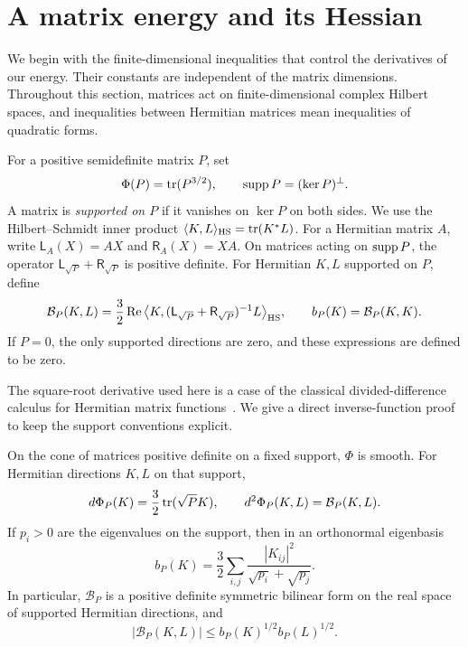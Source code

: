 \section{A matrix energy and its Hessian}\label{sec:matrix}

We begin with the finite-dimensional inequalities that control the
derivatives of our energy.  Their constants are independent of the
matrix dimensions.  Throughout this section, matrices act on
finite-dimensional complex Hilbert spaces, and inequalities between
Hermitian matrices mean inequalities of quadratic forms.

For a positive semidefinite matrix $P$, set
\[
 \Phi(P)=\operatorname{tr}(P^{3/2}),
 \qquad \operatorname{supp} P=(\ker P)^\perp.
\]
A matrix is \emph{supported on $P$} if it vanishes on $\ker P$ on
both sides.  We use the Hilbert--Schmidt inner product
$\langle K,L\rangle_{\mathrm{HS}}=\operatorname{tr}(K^*L)$.
For a Hermitian matrix $A$, write
$\mathsf L_A(X)=AX$ and $\mathsf R_A(X)=XA$.
On matrices acting on $\operatorname{supp} P$, the operator
$\mathsf L_{\sqrt P}+\mathsf R_{\sqrt P}$ is positive definite.
For Hermitian $K,L$ supported on $P$, define
\[
 \mathcal B_P(K,L)
 =\frac32\operatorname{Re}
   \big\langle K,
    (\mathsf L_{\sqrt P}+\mathsf R_{\sqrt P})^{-1}L
   \big\rangle_{\mathrm{HS}},
 \qquad b_P(K)=\mathcal B_P(K,K).
\]
If $P=0$, the only supported directions are zero, and these expressions
are defined to be zero.

The square-root derivative used here is a case of the classical
divided-difference calculus for Hermitian matrix
functions~\cite[Section~1, Equation~(1)]{Daletskii1957}.
We give a direct inverse-function proof to keep the support conventions explicit.

\begin{lemma}\label{lem:hessian}
On the cone of matrices positive definite on a fixed support,
$\Phi$ is smooth.  For Hermitian directions $K,L$ on that support,
\[
 d\Phi_P(K)=\frac32\operatorname{tr}(\sqrt P K),
 \qquad
 d^2\Phi_P(K,L)=\mathcal B_P(K,L).
\]
If $p_i>0$ are the eigenvalues on the support, then in an orthonormal
eigenbasis
\begin{equation}\label{eq:hessian-metric}
 b_P(K)=\frac32\sum_{i,j}
          \frac{|K_{ij}|^2}{\sqrt{p_i}+\sqrt{p_j}}.
\end{equation}
In particular, $\mathcal B_P$ is a positive definite symmetric bilinear
form on the real space of supported Hermitian directions, and
\[
 |\mathcal B_P(K,L)|\le b_P(K)^{1/2}b_P(L)^{1/2}.
\]
\end{lemma}

